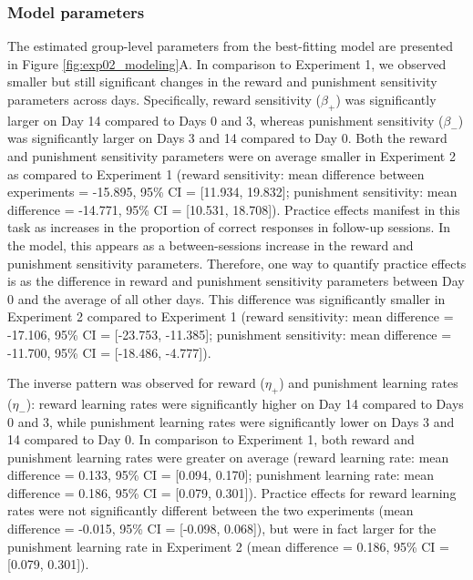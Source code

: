 \documentclass[a4paper,12pt]{article}
\begin{document}
\begin{refsection}[main]
\subsubsection*{Model parameters}

The estimated group-level parameters from the best-fitting model are presented in Figure \ref{fig:exp02_modeling}A. In comparison to Experiment 1, we observed smaller but still significant changes in the reward and punishment sensitivity parameters across days. Specifically, reward sensitivity ($\beta_+$) was significantly larger on Day 14 compared to Days 0 and 3, whereas punishment sensitivity ($\beta_-$) was significantly larger on Days 3 and 14 compared to Day 0. Both the reward and punishment sensitivity parameters were on average smaller in Experiment 2 as compared to Experiment 1 (reward sensitivity: mean difference between experiments = -15.895, 95\% CI = [11.934, 19.832]; punishment sensitivity: mean difference = -14.771, 95\% CI = [10.531, 18.708]). Practice effects manifest in this task as increases in the proportion of correct responses in follow-up sessions. In the model, this appears as a between-sessions increase in the reward and punishment sensitivity parameters. Therefore, one way to quantify practice effects is as the difference in reward and punishment sensitivity parameters between Day 0 and the average of all other days. This difference was significantly smaller in Experiment 2 compared to Experiment 1 (reward sensitivity: mean difference = -17.106, 95\% CI = [-23.753, -11.385]; punishment sensitivity: mean difference = -11.700, 95\% CI = [-18.486, -4.777]).

The inverse pattern was observed for reward ($\eta_+$) and punishment learning rates ($\eta_-$): reward learning rates were significantly higher on Day 14 compared to Days 0 and 3, while punishment learning rates were significantly lower on Days 3 and 14 compared to Day 0. In comparison to Experiment 1, both reward and punishment learning rates were greater on average (reward learning rate: mean difference = 0.133, 95\% CI = [0.094, 0.170]; punishment learning rate: mean difference = 0.186, 95\% CI = [0.079, 0.301]). Practice effects for reward learning rates were not significantly different between the two experiments (mean difference = -0.015, 95\% CI = [-0.098, 0.068]), but were in fact larger for the punishment learning rate in Experiment 2 (mean difference = 0.186, 95\% CI =[0.079, 0.301]).


\end{refsection}
\end{document}
